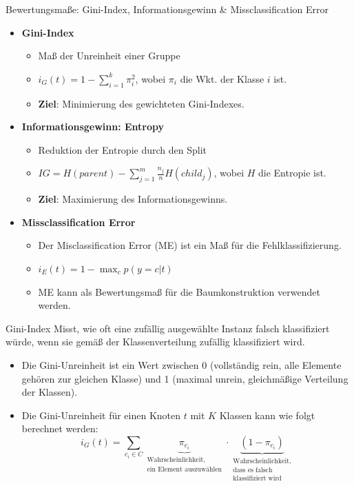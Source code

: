 \documentclass{beamer}
\begin{document}
\begin{frame}{Bewertungsmaße: Gini-Index, Informationsgewinn \& Missclassification Error}
	\begin{itemize}
		\item{\textbf{Gini-Index}}
		\begin{itemize}
			\item Maß der Unreinheit einer Gruppe
			\item $i_G (t) = 1 - \sum_{i=1}^k \pi_i^2$, wobei $\pi_i$ die Wkt. der Klasse $i$ ist.
			\item \textbf{Ziel}: Minimierung des gewichteten Gini-Indexes.
		\end{itemize}
		\item{\textbf{Informationsgewinn: Entropy}}
		\begin{itemize}
			\item Reduktion der Entropie durch den Split
			\item $IG = H(parent) - \sum_{j=1}^m \frac{n_j}{n} H(child_j)$, wobei $H$ die Entropie ist.
			\item \textbf{Ziel}: Maximierung des Informationsgewinns.
		\end{itemize}
		\item{\textbf{Missclassification Error}}
		\begin{itemize}
			\item {Der Misclassification Error (ME) ist ein Maß für die Fehlklassifizierung.}
			\item $i_E (t) = 1 - \max_c p(y = c | t)$
			\item {ME kann als Bewertungsmaß für die Baumkonstruktion verwendet werden.}
		\end{itemize}
	\end{itemize}
\end{frame}

\begin{frame}{Gini-Index}
	Misst, wie oft eine zufällig ausgewählte Instanz falsch klassifiziert würde, wenn sie gemäß der Klassenverteilung zufällig klassifiziert wird.
	
	\begin{itemize}
		\item Die Gini-Unreinheit ist ein Wert zwischen 0 (vollständig rein, alle Elemente gehören zur gleichen Klasse) und 1 (maximal unrein, gleichmäßige Verteilung der Klassen).
		\item Die Gini-Unreinheit für einen Knoten $t$ mit $K$ Klassen kann wie folgt berechnet werden:
		\[
		i_G (t) = \sum_{c_i \in C} \underbrace{\pi_{c_i}}_{\substack{\text{Wahrscheinlichkeit,} \\ \text{ein Element auszuwählen}}} \cdot \underbrace{(1 - \pi_{c_i})}_{\substack{\text{Wahrscheinlichkeit,} \\ \text{dass es falsch} \\ \text{klassifiziert wird}}}
		\]
	\end{itemize}
	\end{frame}
	
\end{document}
